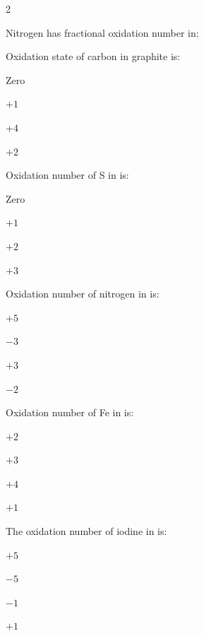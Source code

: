 \documentclass[10pt,a4paper]{article}
\begin{document}
\begin{multicols}{2}
\begin{questions}[start=56]
\item Nitrogen has fractional oxidation number in:
\begin{options}
  \item {}
  \item {}
  \item {}
  \item {}
\end{options}

\item Oxidation state of carbon in graphite is:
\begin{options}
  \item Zero
  \item $+1$
  \item $+4$
  \item $+2$
\end{options}

\item Oxidation number of S in  is:
\begin{options}
  \item Zero
  \item $+1$
  \item $+2$
  \item $+3$
\end{options}

\item Oxidation number of nitrogen in  is:
\begin{options}
  \item $+5$
  \item $-3$
  \item $+3$
  \item $-2$
\end{options}

\item Oxidation number of Fe in  is:
\begin{options}
  \item $+2$
  \item $+3$
  \item $+4$
  \item $+1$
\end{options}

\item The oxidation number of iodine in  is:
\begin{options}
  \item $+5$
  \item $-5$
  \item $-1$
  \item $+1$
\end{options}


\end{questions}
\end{multicols}
\end{document}
